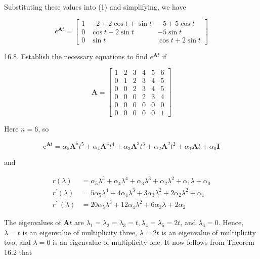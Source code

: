 \documentclass[10pt]{article}
\begin{document}
Substituting these values into (1) and simplifying, we have

$$
e^{\mathbf{A} t}=\left[\begin{array}{ccc}
1 & -2+2 \cos t+\sin t & -5+5 \cos t \\
0 & \cos t-2 \sin t & -5 \sin t \\
0 & \sin t & \cos t+2 \sin t
\end{array}\right]
$$

16.8. Establish the necessary equations to find $e^{\mathbf{A} t}$ if

$$
\mathbf{A}=\left[\begin{array}{llllll}
1 & 2 & 3 & 4 & 5 & 6 \\
0 & 1 & 2 & 3 & 4 & 5 \\
0 & 0 & 2 & 3 & 4 & 5 \\
0 & 0 & 0 & 2 & 3 & 4 \\
0 & 0 & 0 & 0 & 0 & 0 \\
0 & 0 & 0 & 0 & 0 & 1
\end{array}\right]
$$

Here $n=6$, so

$$
\mathrm{e}^{\mathbf{A} t}=\alpha_{5} \mathbf{A}^{5} t^{5}+\alpha_{4} \mathbf{A}^{4} t^{4}+\alpha_{3} \mathbf{A}^{3} t^{3}+\alpha_{2} \mathbf{A}^{2} t^{2}+\alpha_{1} \mathbf{A} t+\alpha_{0} \mathbf{I}
$$

and

$$
\begin{aligned}
r(\lambda) & =\alpha_{5} \lambda^{5}+\alpha_{4} \lambda^{4}+\alpha_{3} \lambda^{3}+\alpha_{2} \lambda^{2}+\alpha_{1} \lambda+\alpha_{0} \\
r^{\prime}(\lambda) & =5 \alpha_{5} \lambda^{4}+4 \alpha_{4} \lambda^{3}+3 \alpha_{3} \lambda^{2}+2 \alpha_{2} \lambda^{2}+\alpha_{1} \\
r^{\prime \prime}(\lambda) & =20 \alpha_{5} \lambda^{3}+12 \alpha_{4} \lambda^{2}+6 \alpha_{3} \lambda+2 \alpha_{2}
\end{aligned}
$$

The eigenvalues of $\mathbf{A} t$ are $\lambda_{1}=\lambda_{2}=\lambda_{3}=t, \lambda_{4}=\lambda_{5}=2 t$, and $\lambda_{6}=0$. Hence, $\lambda=t$ is an eigenvalue of multiplicity three, $\lambda=2 t$ is an eigenvalue of multiplicity two, and $\lambda=0$ is an eigenvalue of multiplicity one. It now follows from Theorem 16.2 that
\end{document}
